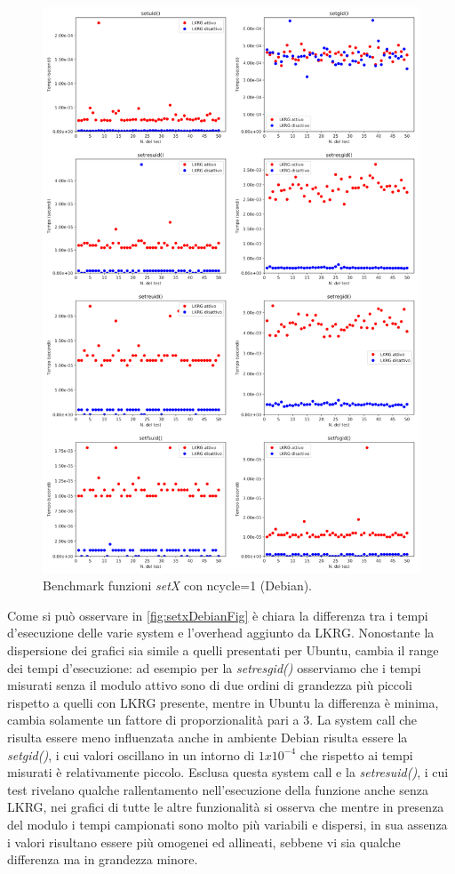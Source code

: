 \begin{figure}[!ht]
\centering
\includegraphics[scale=1.3]{Figures/Debian/SingleSet}
\caption[Benchmark funzioni \emph{setX} con ncycle=1 (Debian)]{Benchmark funzioni \emph{setX} con ncycle=1 (Debian).}
\label{fig:setxDebianFig}
\end{figure}

Come si può osservare in \autoref{fig:setxDebianFig} è chiara la differenza tra i tempi d'esecuzione delle varie system e l'overhead aggiunto da LKRG. Nonostante la dispersione dei grafici sia simile a quelli presentati per Ubuntu, cambia il range dei tempi d'esecuzione: ad esempio per la \emph{setresgid()} osserviamo che i tempi misurati senza il modulo attivo sono di due ordini di grandezza più piccoli rispetto a quelli con LKRG presente, mentre in Ubuntu la differenza è minima, cambia solamente un fattore di proporzionalità pari a 3.
La system call che risulta essere meno influenzata anche in ambiente Debian risulta essere la \emph{setgid()}, i cui valori oscillano in un intorno di $1x10^{-4}$ che rispetto ai tempi misurati è relativamente piccolo. Esclusa questa system call e la \emph{setresuid()}, i cui test rivelano qualche rallentamento nell'esecuzione della funzione anche senza LKRG, nei grafici di tutte le altre funzionalità si osserva che mentre in presenza del modulo i tempi campionati sono molto più variabili e dispersi, in sua assenza i valori risultano essere più omogenei ed allineati, sebbene vi sia qualche differenza ma in grandezza minore.

